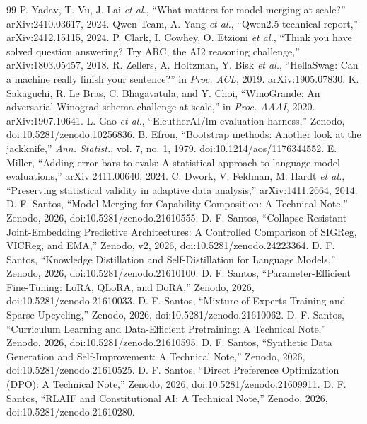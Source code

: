 \documentclass[conference]{IEEEtran}
\begin{document}
\begin{thebibliography}{99}
 P. Yadav, T. Vu, J. Lai \emph{et al.}, ``What matters for model merging at scale?'' arXiv:2410.03617, 2024.
 Qwen Team, A. Yang \emph{et al.}, ``Qwen2.5 technical report,'' arXiv:2412.15115, 2024.
 P. Clark, I. Cowhey, O. Etzioni \emph{et al.}, ``Think you have solved question answering? Try ARC, the AI2 reasoning challenge,'' arXiv:1803.05457, 2018.
 R. Zellers, A. Holtzman, Y. Bisk \emph{et al.}, ``HellaSwag: Can a machine really finish your sentence?'' in \emph{Proc. ACL}, 2019. arXiv:1905.07830.
 K. Sakaguchi, R. Le Bras, C. Bhagavatula, and Y. Choi, ``WinoGrande: An adversarial Winograd schema challenge at scale,'' in \emph{Proc. AAAI}, 2020. arXiv:1907.10641.
 L. Gao \emph{et al.}, ``EleutherAI/lm-evaluation-harness,'' Zenodo, doi:10.5281/zenodo.10256836.
 B. Efron, ``Bootstrap methods: Another look at the jackknife,'' \emph{Ann. Statist.}, vol. 7, no. 1, 1979. doi:10.1214/aos/1176344552.
 E. Miller, ``Adding error bars to evals: A statistical approach to language model evaluations,'' arXiv:2411.00640, 2024.
 C. Dwork, V. Feldman, M. Hardt \emph{et al.}, ``Preserving statistical validity in adaptive data analysis,'' arXiv:1411.2664, 2014.
 D. F. Santos, ``Model Merging for Capability Composition: A Technical Note,'' Zenodo, 2026, doi:10.5281/zenodo.21610555.
 D. F. Santos, ``Collapse-Resistant Joint-Embedding Predictive Architectures: A Controlled Comparison of SIGReg, VICReg, and EMA,'' Zenodo, v2, 2026, doi:10.5281/zenodo.24223364.
 D. F. Santos, ``Knowledge Distillation and Self-Distillation for Language Models,'' Zenodo, 2026, doi:10.5281/zenodo.21610100.
 D. F. Santos, ``Parameter-Efficient Fine-Tuning: LoRA, QLoRA, and DoRA,'' Zenodo, 2026, doi:10.5281/zenodo.21610033.
 D. F. Santos, ``Mixture-of-Experts Training and Sparse Upcycling,'' Zenodo, 2026, doi:10.5281/zenodo.21610062.
 D. F. Santos, ``Curriculum Learning and Data-Efficient Pretraining: A Technical Note,'' Zenodo, 2026, doi:10.5281/zenodo.21610595.
 D. F. Santos, ``Synthetic Data Generation and Self-Improvement: A Technical Note,'' Zenodo, 2026, doi:10.5281/zenodo.21610525.
 D. F. Santos, ``Direct Preference Optimization (DPO): A Technical Note,'' Zenodo, 2026, doi:10.5281/zenodo.21609911.
 D. F. Santos, ``RLAIF and Constitutional AI: A Technical Note,'' Zenodo, 2026, doi:10.5281/zenodo.21610280.
\end{thebibliography}
\end{document}
